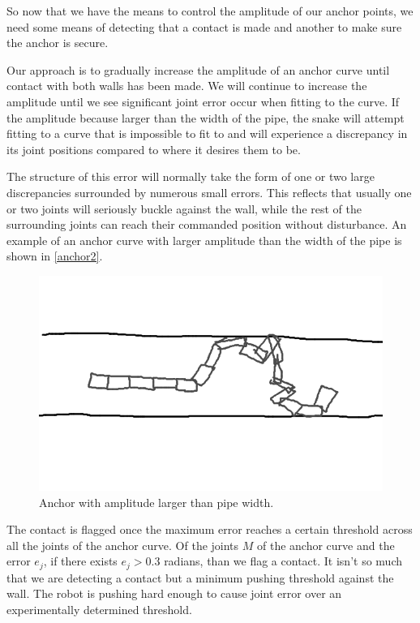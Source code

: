 So now that we have the means to control the amplitude of our anchor points, we need some means of detecting that a contact is made and another to make sure the anchor is secure. 

Our approach is to gradually increase the amplitude of an anchor curve until contact with both walls has been made. We will continue to increase the amplitude until we see significant joint error occur when fitting to the curve. If the amplitude because larger than the width of the pipe, the snake will attempt fitting to a curve that is impossible to fit to and will experience a discrepancy in its joint positions compared to where it desires them to be.

The structure of this error will normally take the form of one or two large discrepancies surrounded by numerous small errors. This reflects that usually one or two joints will seriously buckle against the wall, while the rest of the surrounding joints can reach their commanded position without disturbance. An example of an anchor curve with larger amplitude than the width of the pipe is shown in \autoref{anchor2}.

\begin{figure}[htbp]
\centering
\includegraphics[keepaspectratio,width=400pt,height=0.75\textheight]{2_anchoring_2.png}
\caption{Anchor with amplitude larger than pipe width.}
\label{anchor2}
\end{figure}



The contact is flagged once the maximum error reaches a certain threshold across all the joints of the anchor curve. Of the joints $M$ of the anchor curve and the error $e_j$, if there exists $e_j > 0.3$ radians, than we flag a contact. It isn't so much that we are detecting a contact but a minimum pushing threshold against the wall. The robot is pushing hard enough to cause joint error over an experimentally determined threshold.

